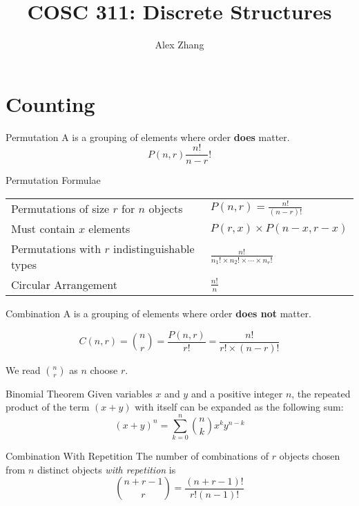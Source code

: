 \documentclass[12pt]{report}
\title{COSC 311: Discrete Structures}
\author{Alex Zhang}
\begin{document}
\renewcommand{\arraystretch}{1.25}

\maketitle
\tableofcontents
\newpage

\chapter{Counting}
\begin{dfnbox}{Permutation}
	A  is a grouping of elements where order \textbf{does} matter.
	\[ P(n, r) \frac{n!}{n-r}! \]
\end{dfnbox}

\begin{genbox}{Permutation Formulae}
	\begin{center}\begin{tabular}{ll}
		Permutations of size $r$ for $n$ objects & $P(n, r) = \frac{n!}{(n-r)!}$ \\
		Must contain $x$ elements & $P(r, x) \times P(n-x, r-x)$ \\
		Permutations with $r$ indistinguishable types & $\frac{n!}{n_1! \times n_2! \times \cdots \times n_r!}$ \\
		Circular Arrangement & $\frac{n!}{n}$ \\
	\end{tabular}\end{center}
\end{genbox}

\begin{dfnbox}{Combination}
	A  is a grouping of elements where order \textbf{does not} matter.
	
	$$ C(n,r) = {n \choose r} = \frac{P(n,r)}{r!} = \frac{n!}{r! \times (n-r)!}$$
\end{dfnbox}

We read ${n \choose r}$ as $n$ choose $r$.

\begin{thmbox}{Binomial Theorem}
	Given variables $x$ and $y$ and a positive integer $n$, the repeated product of the term $(x+y)$ with itself can be expanded as the following sum:
	$$(x+y)^n = \sum_{k=0}^{n} {n \choose k} x^k y^{n-k} $$
\end{thmbox}

\begin{thmbox}{Combination With Repetition}
	The number of combinations of $r$ objects chosen from $n$ distinct objects \textit{with repetition} is
	$${{n+r-1}\choose{r}} = \frac{(n+r-1)!}{r!(n-1)!}$$
\end{thmbox}
\end{document}
